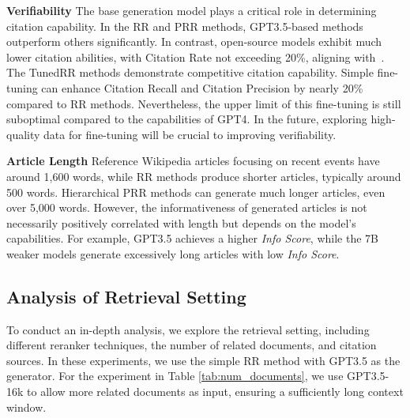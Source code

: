 \documentclass[11pt]{article}
\begin{document}
\noindent \textbf{Verifiability}\quad
The base generation model plays a critical role in determining citation capability. In the RR and PRR methods, GPT3.5-based methods outperform others significantly. In contrast, open-source models exhibit much lower citation abilities, with Citation Rate not exceeding 20\%, aligning with~\citet{gao-etal-2023-enabling}. The TunedRR methods demonstrate competitive citation capability. Simple fine-tuning can enhance Citation Recall and Citation Precision by nearly 20\% compared to RR methods. Nevertheless, the upper limit of this fine-tuning is still suboptimal compared to the capabilities of GPT4. In the future, exploring high-quality data for fine-tuning will be crucial to improving verifiability.

\noindent \textbf{Article Length}\quad
Reference Wikipedia articles focusing on recent events have around 1,600 words, while RR methods produce shorter articles, typically around 500 words. Hierarchical PRR methods can generate much longer articles, even over 5,000 words. However, the informativeness of generated articles is not necessarily positively correlated with length but depends on the model's capabilities. For example, GPT3.5 achieves a higher \textit{Info Score}, while the 7B weaker models generate excessively long articles with low \textit{Info Score}.

\subsection{Analysis of Retrieval Setting}
To conduct an in-depth analysis, we explore the retrieval setting, including different reranker techniques, the number of related documents, and citation sources. In these experiments, we use the simple RR method with GPT3.5 as the generator. For the experiment in Table \ref{tab:num_documents}, we use GPT3.5-16k to allow more related documents as input, ensuring a sufficiently long context window.
\end{document}
